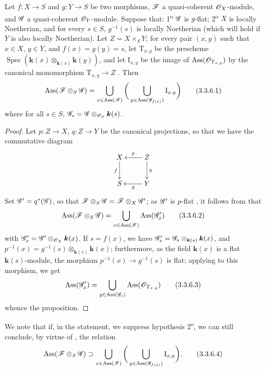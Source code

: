 \begin{proposition}[3.3.6]
\label{IV.3.3.6}
Let $f:X\to S$ and $g:Y\to S$ be two morphisms, $\mathscr{F}$ a quasi-coherent $\mathscr{O}_X$-module, and $\mathscr{G}$ a quasi-coherent $\mathscr{O}_Y$-module.
Suppose that: 1\textsuperscript{o} $\mathscr{G}$ is $g$-flat; 2\textsuperscript{o} $X$ is locally Noetherian, and for every $s\in S$, $g^{-1}(s)$ is locally Noetherian (which will hold if $Y$ is also locally Noetherian).
Let $Z=X\times_S Y$; for every pair $(x,y)$ such that $x\in X$, $y\in Y$,
and $f(x)=g(y)=s$, let $\mathrm{T}_{x,y}$ be the prescheme $\operatorname{Spec}(\boldsymbol{k}(x)\otimes_{\boldsymbol{k}(s)}\boldsymbol{k}(y))$, and let $\mathrm{I}_{x,y}$ be the image of $\operatorname{Ass}(\mathscr{O}_{\mathrm{T}_{x,y}})$ by the canonical monomorphism $\mathrm{T}_{x,y}\to Z$ .
Then
\[
\label{IV.3.3.6.1}
\operatorname{Ass}(\mathscr{F}\otimes_S\mathscr{G})=\bigcup_{x\in\operatorname{Ass}(\mathscr{F})}\bigg(\bigcup_{y\in\operatorname{Ass}(\mathscr{G}_{f(x)})}\mathrm{I}_{x,y}\bigg)
\tag{3.3.6.1}
\]
where for all $s\in S$, $\mathscr{G}_s=\mathscr{G}\otimes_{\mathscr{O}_S}\boldsymbol{k}(s)$.
\end{proposition}

\begin{proof}
Let $p:Z\to X$, $q:Z\to Y$ be the canonical projections, so that we have the commutative diagram
\[
\xymatrix{
X\ar[d]_{f} & Z\ar[l]_{p}\ar[d]^{q}\\
S & Y\ar[l]^{g}
}
\]
Set $\mathscr{G}'=q^*(\mathscr{G})$, so that $\mathscr{F}\otimes_S\mathscr{G}=\mathscr{F}\otimes_X\mathscr{G}'$; as $\mathscr{G}'$ is $p$-flat , it follows from  that
\[
\label{IV.3.3.6.2}
\operatorname{Ass}(\mathscr{F}\otimes_S\mathscr{G})=\bigcup_{x\in\operatorname{Ass}(\mathscr{F})}\operatorname{Ass}(\mathscr{G}'_x)
\tag{3.3.6.2}
\]
with $\mathscr{G}'_x=\mathscr{G}'\otimes_{\mathscr{O}_X}\boldsymbol{k}(x)$.
If $s=f(x)$, we have $\mathscr{G}'_x=\mathscr{G}_s\otimes_{\boldsymbol{k}(s)}\boldsymbol{k}(x)$, and $p^{-1}(x)=g^{-1}(s)\otimes_{\boldsymbol{k}(s)}\boldsymbol{k}(x)$; furthermore, as the field $\boldsymbol{k}(x)$ is a flat $\boldsymbol{k}(s)$-module, the morphism $p^{-1}(x)\to g^{-1}(s)$ is flat; applying  to this morphism, we get
\[
\label{IV.3.3.6.3}
\operatorname{Ass}(\mathscr{G}'_x)=\bigcup_{y\in\operatorname{Ass}(\mathscr{G}_s)}\operatorname{Ass}(\mathscr{O}_{\mathrm{T}_{x,y}})
\tag{3.3.6.3}
\]
whence the proposition.
\end{proof}

We note that if, in the statement, we suppress hypothesis 2\textsuperscript{o}, we can still conclude, by virtue of , the relation
\[
\label{IV.3.3.6.4}
\operatorname{Ass}(\mathscr{F}\otimes_S\mathscr{G})\supset\bigcup_{x\in\operatorname{Ass}(\mathscr{F})}\bigg(\bigcup_{y\in\operatorname{Ass}(\mathscr{G}_{f(x)})}\mathrm{I}_{x,y}\bigg).
\tag{3.3.6.4}
\]

